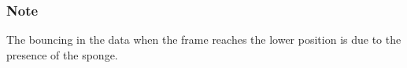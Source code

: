 %
%
%

\subsubsection{Note}
The bouncing in the data when the frame reaches the lower position is due to the presence of the sponge.




